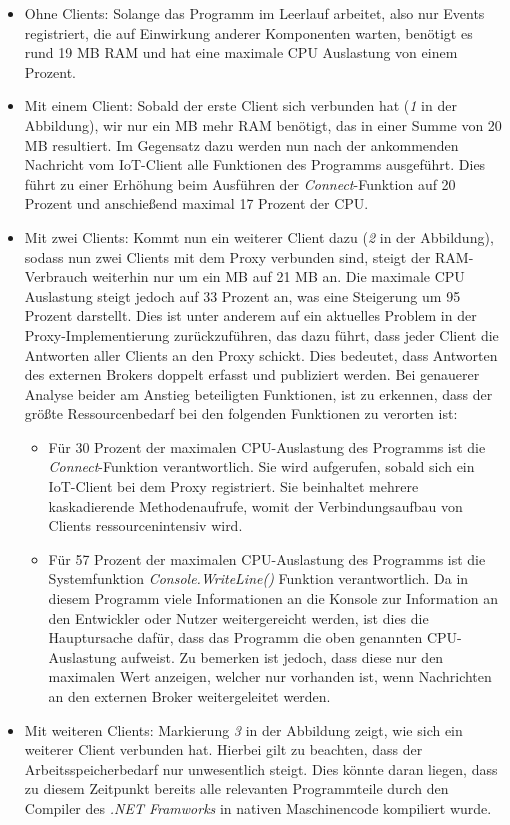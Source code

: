     \begin{itemize}
        \item Ohne Clients:
        Solange das Programm im Leerlauf arbeitet, also nur Events registriert, die auf Einwirkung anderer Komponenten warten, benötigt es rund 19 \ac{MB} \ac{RAM} und hat eine maximale \ac{CPU} Auslastung von einem Prozent.
        \item Mit einem Client:
        Sobald der erste Client sich verbunden hat (\emph{1} in der Abbildung), wir nur ein \ac{MB} mehr \ac{RAM} benötigt, das in einer Summe von 20 \ac{MB} resultiert. Im Gegensatz dazu werden nun nach der ankommenden Nachricht vom \ac{IoT}-Client alle Funktionen des Programms ausgeführt. Dies führt zu einer Erhöhung beim Ausführen der \emph{Connect}-Funktion auf 20 Prozent und anschießend maximal 17 Prozent der \ac{CPU}.
        \item Mit zwei Clients:
        Kommt nun ein weiterer Client dazu (\emph{2} in der Abbildung), sodass nun zwei Clients mit dem Proxy verbunden sind, steigt der \ac{RAM}-Verbrauch weiterhin nur um ein \ac{MB} auf 21 \ac{MB} an. Die maximale \ac{CPU} Auslastung steigt jedoch auf 33 Prozent an, was eine Steigerung um 95 Prozent darstellt. Dies ist unter anderem auf ein aktuelles Problem in der Proxy-Implementierung %
        zurückzuführen, das dazu führt, dass jeder Client die Antworten aller Clients an den Proxy schickt. Dies bedeutet, dass Antworten des externen Brokers doppelt erfasst und publiziert werden.
        Bei genauerer Analyse beider am Anstieg beteiligten Funktionen, ist zu erkennen, dass der größte Ressourcenbedarf bei den folgenden Funktionen zu verorten ist:
        \begin{itemize}
            \item Für 30 Prozent der maximalen \ac{CPU}-Auslastung des Programms ist die \emph{Connect}-Funktion verantwortlich. Sie wird aufgerufen, sobald sich ein \ac{IoT}-Client bei dem Proxy registriert. Sie beinhaltet mehrere kaskadierende Methodenaufrufe, womit der Verbindungsaufbau von Clients ressourcenintensiv wird.  
            \item Für 57 Prozent der maximalen \ac{CPU}-Auslastung des Programms ist die Systemfunktion \emph{Console.WriteLine()} Funktion verantwortlich. Da in diesem Programm viele Informationen an die Konsole zur Information an den Entwickler oder Nutzer weitergereicht werden, ist dies die Hauptursache dafür, dass das Programm die oben genannten \ac{CPU}-Auslastung aufweist. Zu bemerken ist jedoch, dass diese nur den maximalen Wert anzeigen, welcher nur vorhanden ist, wenn Nachrichten an den externen Broker weitergeleitet werden.
        \end{itemize}
        \item Mit weiteren Clients:
        Markierung \emph{3} in der Abbildung zeigt, wie sich ein weiterer Client verbunden hat. Hierbei gilt zu beachten, dass der Arbeitsspeicherbedarf nur unwesentlich steigt. Dies könnte daran liegen, dass zu diesem Zeitpunkt bereits alle relevanten Programmteile durch den Compiler des \emph{.NET Framworks} in nativen Maschinencode kompiliert wurde.
    \end{itemize}
